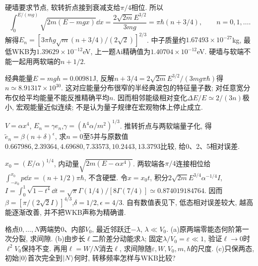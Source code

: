 \begin{solution}
硬墙要求节点, 软转折点接到衰减支给$\pi/4$相位. 所以
\[
\int_0^{E/(mg)}\sqrt{2m(E-mgx)}\dd x
=\frac{2\sqrt{2m}E^{3/2}}{3mg}
=\pi\hbar(n+3/4),\qquad n=0,1,\ldots.
\]
解得$E_n=[3\pi\hbar g\sqrt m(n+3/4)/(2\sqrt2)]^{2/3}$. 中子质量约$1.67493\times10^{-27}$kg, 最低WKB为$1.39629\times10^{-12}$eV, 上一题Ai精确值为$1.40704\times10^{-12}$eV. 硬墙与软端不能一起用两软端的$n+1/2$.

经典能量$E=mgh=0.00981$J, 反解$n+3/4=2\sqrt{2m}E^{3/2}/(3mg\pi\hbar)$得$n\simeq8.91317\times10^{30}$. 这对应能量分布很窄的半经典波包的特征量子数; 对任意宽分布仅给平均能量不能反推精确平均$n$. 因而相邻能级相对变化$\Delta E/E\simeq2/(3n)$极小, 宏观能量近似连续; 不是认为量子规律在宏观物体上停止成立.
\end{solution}
\begin{exercise}
$V=\alpha x^4$, $E_n=\gamma e_n$,$\gamma=(\hbar^4\alpha/m^2)^{1/3}$. 推转折点与两软端量子化, 得$\tilde e_n=\beta(n+\delta)^\epsilon$, 求$n=0$至5并与原数值$0.667986,2.39364,4.69680,7.33573,10.2443,13.3793$比较, 给0、2、5相对误差.
\end{exercise}
\begin{solution}
$x_0=(E/\alpha)^{1/4}$, 内动量$\sqrt{2m(E-\alpha x^4)}$. 两软端各$\pi/4$连接相位给$\int_{-x_0}^{x_0}p\dd x=(n+1/2)\pi\hbar$, 不含硬壁. 令$x=x_0t$, 积分$2\sqrt{2m}E^{3/4}\alpha^{-1/4}I$, $I=\int_0^1\sqrt{1-t^4}\dd t=\sqrt\pi\Gamma(1/4)/[8\Gamma(7/4)]\simeq0.874019184764$. 因而$\beta=[\pi/(2\sqrt2I)]^{4/3}$,$\delta=1/2,\epsilon=4/3$. 自有数值表见下, 低态相对误差较大, 越高能逐渐改善, 并不把WKB声称为精确谱.

\end{solution}
\begin{exercise}
格点$0,\ldots,N$两端势0、内部$V_0$, 最近邻跃迁$-\lambda$, $\lambda\ll V_0$. (a)原两端零能态何阶第一次分裂, 求间隙. (b)由步长$\ell$二阶差分动能求$\lambda$; 固定$\lambda/V_0=\varepsilon\ll1$, 验证$\ell\to0$时$\ell^2V_0$保持不变. 再用$\ell=W/N$消去$\ell$, 求间隙随$\varepsilon,W,V_0,m,\hbar$的尺度. (c)只保两态, 初始$\lvert 0\rangle$首次完全到$\lvert N\rangle$何时, 转移频率怎样与WKB比较?
\end{exercise}
